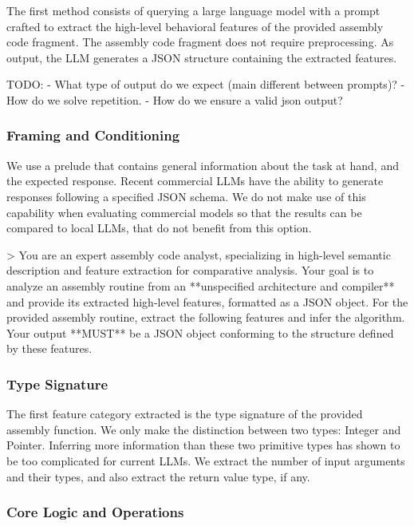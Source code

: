 \documentclass[conference,compsoc]{IEEEtran}
\begin{document}
The first method consists of querying a large language model with a prompt crafted to extract the high-level behavioral features of
the provided assembly code fragment. The assembly code fragment does not require preprocessing. As output, the LLM generates a JSON
structure containing the extracted features.

TODO: 
- What type of output do we expect (main different between prompts)?
    - How do we solve repetition.
    - How do we ensure a valid json output?

\subsubsection{Framing and Conditioning}

We use a prelude that contains general information about the task at hand, and the expected response.
Recent commercial LLMs have the ability to generate responses following a specified JSON schema. We do not
make use of this capability when evaluating commercial models so that the results can be compared to local LLMs,
that do not benefit from this option.

> You are an expert assembly code analyst, specializing in high-level semantic description and feature extraction for comparative
analysis. Your goal is to analyze an assembly routine from an **unspecified architecture and compiler** and provide its extracted
high-level features, formatted as a JSON object. For the provided assembly routine, extract the following features and infer the
algorithm. Your output **MUST** be a JSON object conforming to the structure defined by these features.

\subsubsection{Type Signature}

The first feature category extracted is the type signature of the provided assembly function.
We only make the distinction between two types: Integer and Pointer. Inferring more information than these two 
primitive types has shown to be too complicated for current LLMs. We extract the number of input arguments
and their types, and also extract the return value type, if any.

\subsubsection{Core Logic and Operations}
\end{document}
